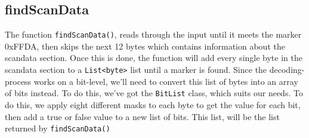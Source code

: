 \subsection{findScanData}
The function \lstinline|findScanData()|, reads through the input until it meets the marker 0xFFDA, then skips the next 12 bytes which contains information about the scandata section.
Once this is done, the function will add every single byte in the scandata section to a \lstinline|List<byte>| list until a marker is found.
Since the decoding-process works on a bit-level, we'll need to convert this list of bytes into an array of bits instead. To do this, we've got the \lstinline|BitList| class, which suits our needs.
To do this, we apply eight different masks to each byte to get the value for each bit, then add a true or false value to a new list of bits. 
This list, will be the list returned by \lstinline|findScanData()|
